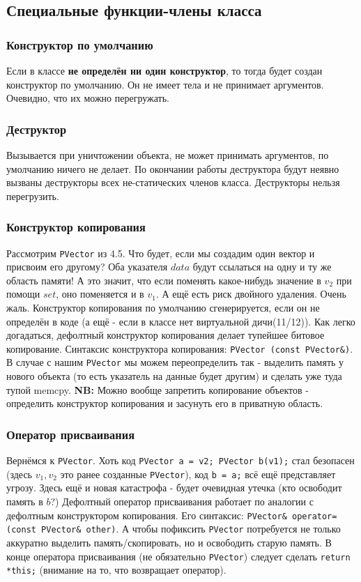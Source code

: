 \documentclass[15pt, a4paper]{article}
\newcommand{\nl}{\newline}
\begin{document}
  \subsection{Специальные функции-члены класса}
  \subsubsection{Конструктор по умолчанию}
  Если в классе \textbf{не определён ни один конструктор}, то тогда будет создан конструктор по умолчанию. Он не имеет тела и не принимает аргументов. Очевидно, что их можно перегружать.
  \subsubsection{Деструктор}
  Вызывается при уничтожении объекта, не может принимать аргументов, по умолчанию ничего не делает.
  По окончании работы деструктора будут неявно вызваны деструкторы всех не-статических членов класса. Деструкторы нельзя перегрузить.
  \subsubsection{Конструктор копирования}
  Рассмотрим \texttt{PVector} из 4.5. Что будет, если мы создадим один вектор и присвоим его другому? Оба указателя $data$ будут ссылаться на одну и ту же область памяти!
  А это значит, что если поменять какое-нибудь значение в $v_2$ при помощи $set$, оно поменяется и в $v_1$. А ещё есть риск двойного удаления. Очень жаль. \nl
  Конструктор копирования по умолчанию сгенерируется, если он не определён в коде (а ещё - если в классе нет виртуальной дичи(11/12)).
  Как легко догадаться, дефолтный конструктор копирования делает тупейшее битовое копирование.
  Синтаксис конструктора копирования: \texttt{PVector (const PVector\&)}. В случае с нашим \texttt{PVector} мы можем переопределить так - 
  выделить память у нового объекта (то есть указатель на данные будет другим) и сделать уже туда тупой memcpy. \nl
  \textbf{NB:} Можно вообще запретить копирование объектов - определить конструктор копирования и засунуть его в приватную область. \newpage
  \subsubsection{Оператор присваивания}
  Вернёмся к \texttt{PVector}. Хоть код \texttt{PVector a = v2; PVector b(v1);} стал безопасен (здесь $v_1, v_2$ это ранее созданные \texttt{PVector}), 
  код \texttt{b = a;} всё ещё представляет угрозу. Здесь ещё и новая катастрофа - будет очевидная утечка (кто освободит память в $b$?)
  Дефолтный оператор присваивания работает по аналогии с дефолтным конструктором копирования. Его синтаксис:
  \texttt{PVector\& operator=(const PVector\& other)}. А чтобы пофиксить \texttt{PVector} потребуется не только аккуратно выделить память/скопировать, но и освободить старую память. В конце оператора присваивания
  (не обязательно \texttt{PVector}) следует сделать \texttt{return *this;} (внимание на то, что возвращает оператор).
\end{document}
